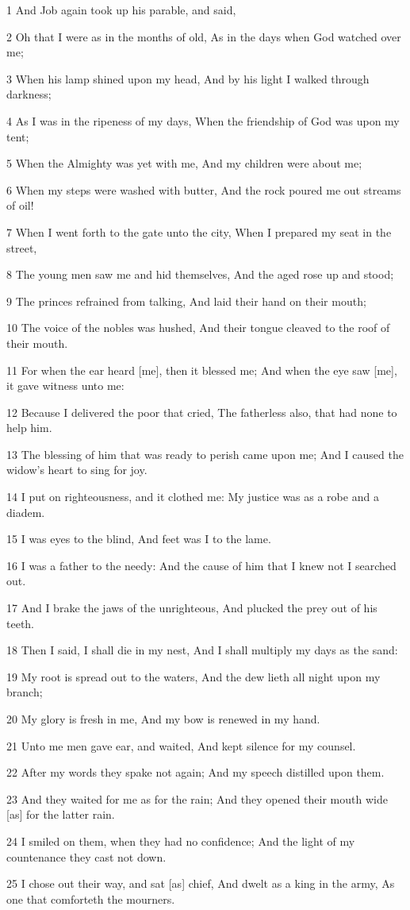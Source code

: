 \par 1 And Job again took up his parable, and said,
\par 2 Oh that I were as in the months of old, As in the days when God watched over me;
\par 3 When his lamp shined upon my head, And by his light I walked through darkness;
\par 4 As I was in the ripeness of my days, When the friendship of God was upon my tent;
\par 5 When the Almighty was yet with me, And my children were about me;
\par 6 When my steps were washed with butter, And the rock poured me out streams of oil!
\par 7 When I went forth to the gate unto the city, When I prepared my seat in the street,
\par 8 The young men saw me and hid themselves, And the aged rose up and stood;
\par 9 The princes refrained from talking, And laid their hand on their mouth;
\par 10 The voice of the nobles was hushed, And their tongue cleaved to the roof of their mouth.
\par 11 For when the ear heard [me], then it blessed me; And when the eye saw [me], it gave witness unto me:
\par 12 Because I delivered the poor that cried, The fatherless also, that had none to help him.
\par 13 The blessing of him that was ready to perish came upon me; And I caused the widow's heart to sing for joy.
\par 14 I put on righteousness, and it clothed me: My justice was as a robe and a diadem.
\par 15 I was eyes to the blind, And feet was I to the lame.
\par 16 I was a father to the needy: And the cause of him that I knew not I searched out.
\par 17 And I brake the jaws of the unrighteous, And plucked the prey out of his teeth.
\par 18 Then I said, I shall die in my nest, And I shall multiply my days as the sand:
\par 19 My root is spread out to the waters, And the dew lieth all night upon my branch;
\par 20 My glory is fresh in me, And my bow is renewed in my hand.
\par 21 Unto me men gave ear, and waited, And kept silence for my counsel.
\par 22 After my words they spake not again; And my speech distilled upon them.
\par 23 And they waited for me as for the rain; And they opened their mouth wide [as] for the latter rain.
\par 24 I smiled on them, when they had no confidence; And the light of my countenance they cast not down.
\par 25 I chose out their way, and sat [as] chief, And dwelt as a king in the army, As one that comforteth the mourners.

